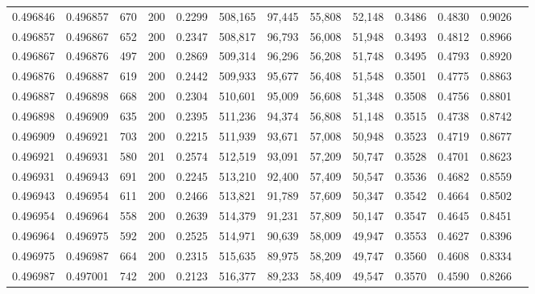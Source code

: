 \begin{tabular}{rrrrrrrrrrrrr}
0.496846 & 0.496857 &    670 & 200 &                                     0.2299 & 508,165 &  97,445 &  55,808 &  52,148 & 0.3486 & 0.4830 & 0.9026 \\
0.496857 & 0.496867 &    652 & 200 &                                     0.2347 & 508,817 &  96,793 &  56,008 &  51,948 & 0.3493 & 0.4812 & 0.8966 \\
0.496867 & 0.496876 &    497 & 200 &                                     0.2869 & 509,314 &  96,296 &  56,208 &  51,748 & 0.3495 & 0.4793 & 0.8920 \\
0.496876 & 0.496887 &    619 & 200 &                                     0.2442 & 509,933 &  95,677 &  56,408 &  51,548 & 0.3501 & 0.4775 & 0.8863 \\
0.496887 & 0.496898 &    668 & 200 &                                     0.2304 & 510,601 &  95,009 &  56,608 &  51,348 & 0.3508 & 0.4756 & 0.8801 \\
0.496898 & 0.496909 &    635 & 200 &                                     0.2395 & 511,236 &  94,374 &  56,808 &  51,148 & 0.3515 & 0.4738 & 0.8742 \\
0.496909 & 0.496921 &    703 & 200 &                                     0.2215 & 511,939 &  93,671 &  57,008 &  50,948 & 0.3523 & 0.4719 & 0.8677 \\
0.496921 & 0.496931 &    580 & 201 &                                     0.2574 & 512,519 &  93,091 &  57,209 &  50,747 & 0.3528 & 0.4701 & 0.8623 \\
0.496931 & 0.496943 &    691 & 200 &                                     0.2245 & 513,210 &  92,400 &  57,409 &  50,547 & 0.3536 & 0.4682 & 0.8559 \\
0.496943 & 0.496954 &    611 & 200 &                                     0.2466 & 513,821 &  91,789 &  57,609 &  50,347 & 0.3542 & 0.4664 & 0.8502 \\
0.496954 & 0.496964 &    558 & 200 &                                     0.2639 & 514,379 &  91,231 &  57,809 &  50,147 & 0.3547 & 0.4645 & 0.8451 \\
0.496964 & 0.496975 &    592 & 200 &                                     0.2525 & 514,971 &  90,639 &  58,009 &  49,947 & 0.3553 & 0.4627 & 0.8396 \\
0.496975 & 0.496987 &    664 & 200 &                                     0.2315 & 515,635 &  89,975 &  58,209 &  49,747 & 0.3560 & 0.4608 & 0.8334 \\
0.496987 & 0.497001 &    742 & 200 &                                     0.2123 & 516,377 &  89,233 &  58,409 &  49,547 & 0.3570 & 0.4590 & 0.8266 \\

\end{tabular}
